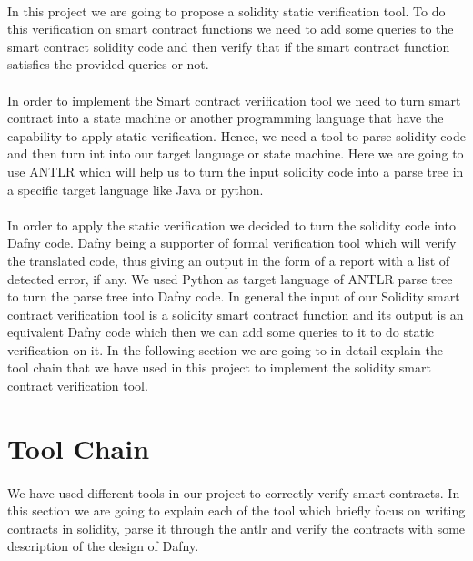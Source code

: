 \documentclass[11pt]{article}
\begin{document}
\paragraph{}
In this project we are going to propose a solidity static verification tool. To do this verification on smart contract functions we need to add some queries to the smart contract solidity code and then verify that if the smart contract function satisfies the provided queries or not. 
\paragraph{}
In order to implement the Smart contract verification tool we need to turn smart contract into a state machine or another programming language that have the capability to apply static verification. Hence, we need a tool to parse solidity code and then turn int into our target language or state machine. Here we are going to use ANTLR which will help us to turn the input solidity code into a parse tree in a specific target language like Java or python.
\paragraph{}
In order to apply the static verification we decided to turn the solidity code into Dafny code. Dafny being a supporter of formal verification tool which will verify the translated code, thus giving an output in the form of a report with a list of detected error, if any. We used Python as target language of ANTLR parse tree to turn the parse tree into Dafny code. In general the input of our Solidity smart contract verification tool is a solidity smart contract function and its output is an equivalent Dafny code which then we can add some queries to it to do static verification on it. In the following section we are going to in detail explain the tool chain that we have used in this project to implement the solidity smart contract verification tool. 

\section{Tool Chain}
\paragraph{}
We have used different tools in our project to correctly verify smart contracts. In this section we are going to explain each of the tool which briefly focus on writing contracts in solidity, parse it through the antlr and verify the contracts with some description of the design of Dafny.
\end{document}

